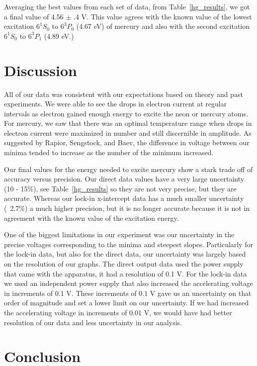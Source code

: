 \documentclass[prb,preprint]{revtex4-1}
\begin{document}
Averaging the best values from each set of data, from Table~\ref{hg_results}, we got a final value of 4.56 $\pm$ .4 V. This value agrees with the known value of the lowest excitation $6^{1}S_{0}$ to $6^{3}P_{0}$ (4.67 eV) of mercury and also with the second excitation $6^{1}S_{0}$ to $6^{3}P_{1}$ (4.89 eV.)~\cite{newfeatures}

\section{Discussion}

All of our data was consistent with our expectations based on theory and past experiments. We were able to see the drops in electron current at regular intervals as electron gained enough energy to excite the neon or mercury atoms. For mercury, we saw that there was an optimal temperature range when drops in electron current were maximized in number and still discernible in amplitude. As suggested by Rapior,  Sengstock, and Baev, the difference in voltage between our minima tended to increase as the number of the minimum increased. 

Our final values for the energy needed to excite mercury show a stark trade off of accuracy versus precision. Our direct data values have a very large uncertainty (10 - 15$\%$), see Table~\ref{hg_results} so they are not very precise, but they are accurate. Whereas our lock-in x-intercept data has a much smaller uncertainty (~2.7$\%$) a much higher precision, but it is no longer accurate because it is not in agreement with the known value of the excitation energy.

One of the biggest limitations in our experiment was our uncertainty in the precise voltages corresponding to the minima and steepest slopes. Particularly for the lock-in data, but also for the direct data, our uncertainty was largely based on the resolution of our graphs. The direct output data used the power supply that came with the apparatus, it had a resolution of 0.1 V. For the lock-in data we used an independent power supply that also increased the accelerating voltage in increments of 0.1 V. These increments of 0.1 V gave us an uncertainty on that order of magnitude and set a lower limit on our uncertainty. If we had increased the accelerating voltage in increments of 0.01 V, we would have had better resolution of our data and less uncertainty in our analysis. 

\section{Conclusion}
\end{document}
